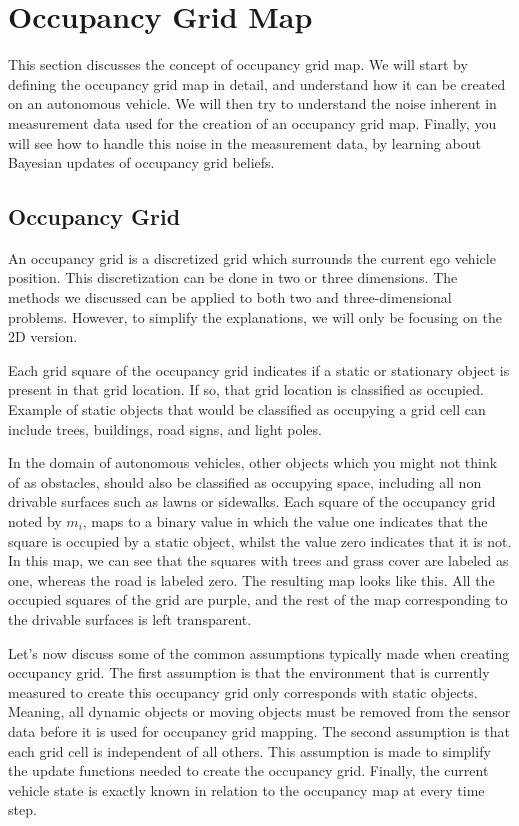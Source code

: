 \section{Occupancy Grid Map}


This section discusses the concept of occupancy grid map. We will start by defining the occupancy grid map in detail, and understand how it can be created on an autonomous vehicle. We will then try to understand
the noise inherent in measurement data used for the creation of an
occupancy grid map. Finally, you will
see how to handle this noise in
the measurement data, by learning about
Bayesian updates of occupancy grid beliefs.

\subsection{Occupancy Grid}


An occupancy grid is a discretized grid which surrounds the current
ego vehicle position. This discretization can be done in two or three dimensions. The methods we discussed
can be applied to both two and three-dimensional problems. However, to simplify
the explanations, we will only be focusing on the 2D version. 

Each grid square of the occupancy grid indicates if a static or stationary object is present in that grid location. If so, that grid location is classified as occupied. Example of static
objects that would be classified as occupying a grid
cell can include trees, buildings, road signs,
and light poles. 

In the domain of autonomous vehicles, other objects which you might
not think of as obstacles, should also be classified
as occupying space, including all non drivable surfaces such as lawns or sidewalks. Each square of the
occupancy grid noted by $m_i$, maps to a binary value
in which the value one indicates that the square is
occupied by a static object, whilst the value zero indicates
that it is not. In this map, we can see
that the squares with trees and grass cover
are labeled as one, whereas the road is labeled zero. The resulting map
looks like this. All the occupied squares
of the grid are purple, and the rest of the map
corresponding to the drivable surfaces
is left transparent. 


Let's now discuss some of the common assumptions typically made when creating occupancy grid.
The first assumption is that  the environment that is currently measured to create this occupancy grid only
corresponds with static objects. Meaning, all dynamic objects
or moving objects must be removed from the sensor data before it is used for
occupancy grid mapping. The second assumption is that each grid cell is independent of all others. 
This assumption is made to simplify the update functions needed
to create the occupancy grid. Finally, the current
vehicle state is exactly known in relation to the occupancy map
at every time step. 

